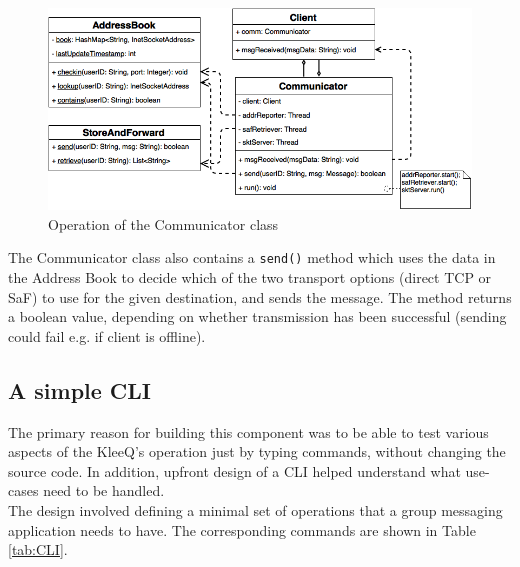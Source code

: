 \documentclass[a4paper, 12pt]{report}
\begin{document}
\begin{figure}[H]
\centering
\includegraphics[width = 0.8 \linewidth]{pics/communicator_uml.png}
\caption{\label{fig:communicator_uml} Operation of the Communicator class}
\end{figure}


The Communicator class also contains a \texttt{send()} method which uses the data in the Address Book to decide which of the two transport options (direct TCP or SaF) to use for the given destination, and sends the message. The method returns a boolean value, depending on whether transmission has been successful (sending could fail e.g. if client is offline).


\subsection{A simple CLI}
\label{subsec:impl.prep.CLI}
The primary reason for building this component was to be able to test various aspects of the KleeQ's operation just by typing commands, without changing the source code. In addition, upfront design of a CLI helped understand what use-cases need to be handled. \\

The design involved defining a minimal set of operations that a group messaging application needs to have. The corresponding commands are shown in Table \ref{tab:CLI}.
\end{document}

